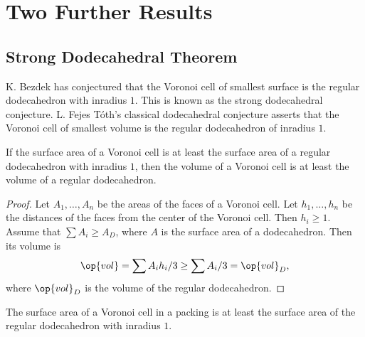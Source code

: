 
\chapter{Two Further Results}


\section{Strong Dodecahedral Theorem}

K. Bezdek has conjectured that the Voronoi cell of smallest surface is
the regular dodecahedron with inradius $1$.  This is known as the
strong dodecahedral conjecture.  L. Fejes T\'oth's classical
dodecahedral conjecture asserts that the Voronoi cell of smallest
volume is the regular dodecahedron of inradius $1$.
%
%
%
%


\begin{lemma}[]
If the surface area of a Voronoi cell is at least the surface area of a regular dodecahedron with
inradius $1$,
then the volume of a Voronoi cell is at least the volume of a regular dodecahedron.
\end{lemma}

\begin{proof} Let $A_1,\ldots,A_n$ be the areas of the faces of a
  Voronoi cell.  Let $h_1,\ldots,h_n$ be the distances of the faces
  from the center of the Voronoi cell.  Then $h_i\ge 1$.  Assume that
  $\sum A_i \ge A_D$, where $A$ is the surface area of a dodecahedron.
  Then its volume is
\begin{displaymath}
\op{vol} = \sum A_i h_i/3 \ge \sum A_i/3 = \op{vol}_D,
\end{displaymath}
where $\op{vol}_D$ is the volume of the regular dodecahedron.
\end{proof}
%
%
%

\begin{theorem}
The surface area of a Voronoi cell in a packing is at least the surface area of the regular dodecahedron
with inradius $1$.
\end{theorem}

